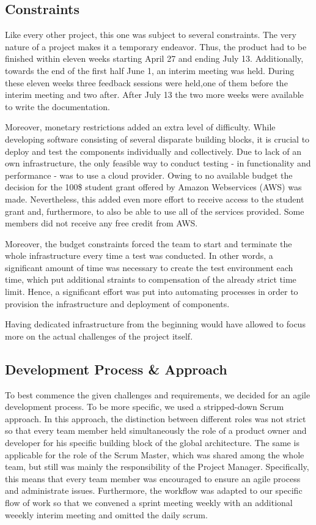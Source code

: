 \subsection{Constraints}\label{constraints}

Like every other project, this one was subject to several constraints.
The very nature of a project makes it a temporary endeavor. Thus, the
product had to be finished within eleven weeks starting April 27 and
ending July 13. Additionally, towards the end of the first half June 1,
an interim meeting was held. During these eleven weeks three feedback
sessions were held,one of them before the interim meeting and two after.
After July 13 the two more weeks were available to write the
documentation.

Moreover, monetary restrictions added an extra level of difficulty.
While developing software consisting of several disparate building
blocks, it is crucial to deploy and test the components individually and
collectively. Due to lack of an own infrastructure, the only feasible
way to conduct testing - in functionality and performance - was to use a
cloud provider. Owing to no available budget the decision for the 100\$
student grant offered by Amazon Webservices (AWS) was made.
Nevertheless, this added even more effort to receive access to the
student grant and, furthermore, to also be able to use all of the
services provided. Some members did not receive any free credit from
AWS.

Moreover, the budget constraints forced the team to start and terminate
the whole infrastructure every time a test was conducted. In other
words, a significant amount of time was necessary to create the test
environment each time, which put additional straints to compensation of
the already strict time limit. Hence, a significant effort was put into
automating processes in order to provision the infrastructure and
deployment of components.

Having dedicated infrastructure from the beginning would have allowed to
focus more on the actual challenges of the project itself.

\subsection{Development Process \&
Approach}\label{development-process-approach}

To best commence the given challenges and requirements, we decided for
an agile development process. To be more specific, we used a
stripped-down Scrum approach. In this approach, the distinction between
different roles was not strict so that every team member held
simultaneously the role of a product owner and developer for his
specific building block of the global architecture. The same is
applicable for the role of the Scrum Master, which was shared among the
whole team, but still was mainly the responsibility of the Project
Manager. Specifically, this means that every team member was encouraged
to ensure an agile process and administrate issues. Furthermore, the
workflow was adapted to our specific flow of work so that we convened a
sprint meeting weekly with an additional weeekly interim meeting and
omitted the daily scrum.

